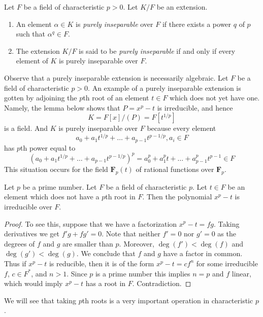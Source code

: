 \begin{definition}
\label{definition-purely-inseparable}
Let $F$ be a field of characteristic $p > 0$. Let $K/F$ be an extension.
\begin{enumerate}
\item An element $\alpha \in K$ is {\it purely inseparable} over $F$
if there exists a power $q$ of $p$ such that $\alpha^q \in F$.
\item The extension $K/F$ is said to be {\it purely inseparable}
if and only if every element of $K$ is purely inseparable over $F$.
\end{enumerate}
\end{definition}

\noindent
Observe that a purely inseparable extension is necessarily algebraic.
Let $F$ be a field of characteristic $p > 0$.
An example of a purely inseparable extension is gotten by adjoining
the $p$th root of an element $t \in F$ which does not yet have one. Namely,
the lemma below shows that $P = x^p - t$ is irreducible, and hence
$$
K = F[x]/(P) = F[t^{1/p}]
$$
is a field. And $K$ is purely inseparable over $F$ because every element
$$
a_0 + a_1t^{1/p} + \ldots + a_{p - 1}t^{p - 1/p}, a_i \in F
$$
has $p$th power equal to
$$
(a_0 + a_1t^{1/p} + \ldots + a_{p - 1}t^{p - 1/p})^p =
a_0^p + a_1^p t + \ldots + a_{p - 1}^pt^{p - 1} \in F
$$
This situation occurs for the field
$\mathbf{F}_p(t)$ of rational functions over $\mathbf{F}_p$.

\begin{lemma}
\label{lemma-take-pth-root}
Let $p$ be a prime number. Let $F$ be a field of characteristic $p$.
Let $t \in F$ be an element which does not have a $p$th root in $F$.
Then the polynomial $x^p - t$ is irreducible over $F$.
\end{lemma}

\begin{proof}
To see this, suppose that we have a factorization
$x^p - t = f g$. Taking derivatives we get $f' g + f g' = 0$.
Note that neither $f' = 0$ nor $g' = 0$ as the degrees of $f$ and $g$
are smaller than $p$. Moreover, $\deg(f') < \deg(f)$ and $\deg(g') < \deg(g)$.
We conclude that $f$ and $g$ have a factor in common. Thus if $x^p - t$
is reducible, then it is of the form $x^p - t = c f^n$ for some irreducible
$f$, $c \in F^*$, and $n > 1$. Since $p$ is a prime number this
implies $n = p$ and $f$ linear, which would imply $x^p - t$ has a root
in $F$. Contradiction.
\end{proof}

\noindent
We will see that taking $p$th roots is a very important operation in
characteristic $p$.

